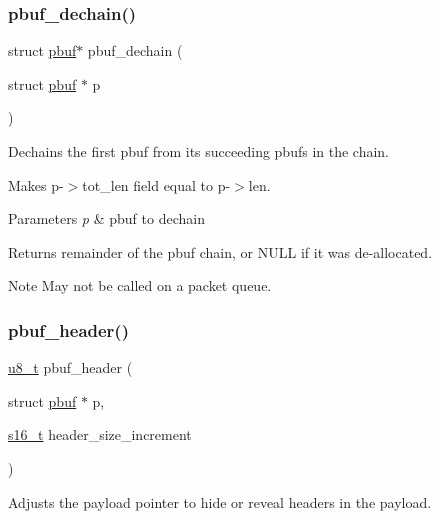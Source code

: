 \subsubsection{\texorpdfstring{pbuf\+\_\+dechain()}{pbuf\_dechain()}}
{\footnotesize\ttfamily struct \hyperlink{structpbuf}{pbuf}$\ast$ pbuf\+\_\+dechain (\begin{DoxyParamCaption}\item[{struct \hyperlink{structpbuf}{pbuf} $\ast$}]{p }\end{DoxyParamCaption})}

Dechains the first pbuf from its succeeding pbufs in the chain.

Makes p-\/$>$tot\+\_\+len field equal to p-\/$>$len. 
\begin{DoxyParams}{Parameters}
{\em p} & pbuf to dechain \\
\hline
\end{DoxyParams}
\begin{DoxyReturn}{Returns}
remainder of the pbuf chain, or N\+U\+LL if it was de-\/allocated. 
\end{DoxyReturn}
\begin{DoxyNote}{Note}
May not be called on a packet queue. 
\end{DoxyNote}
\mbox{\label{openmote-cc2538_2lwip_2src_2core_2pbuf_8c_a0f81deff4a0e6e8e0ff161a7b9871449}} 
\subsubsection{\texorpdfstring{pbuf\+\_\+header()}{pbuf\_header()}}
{\footnotesize\ttfamily \hyperlink{group__compiler__abstraction_ga4caecabca98b43919dd11be1c0d4cd8e}{u8\+\_\+t} pbuf\+\_\+header (\begin{DoxyParamCaption}\item[{struct \hyperlink{structpbuf}{pbuf} $\ast$}]{p,  }\item[{\hyperlink{group__compiler__abstraction_gacf46f4df0ebab84edebcb69967fdf86b}{s16\+\_\+t}}]{header\+\_\+size\+\_\+increment }\end{DoxyParamCaption})}

Adjusts the payload pointer to hide or reveal headers in the payload.

